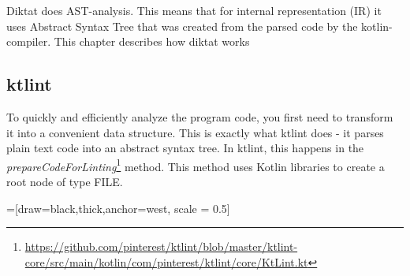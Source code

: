 Diktat does AST-analysis. This means that for internal representation (IR) it uses Abstract Syntax Tree that was created from the parsed code by the kotlin-compiler.  This chapter describes how diktat works

\subsection{ktlint}
\par
To quickly and efficiently analyze the program code, you first need to transform it into a convenient data structure. This is exactly what ktlint does - it parses plain text code into an abstract syntax tree. In ktlint, this happens in the \textsl{prepareCodeForLinting}\footnote{\url{https://github.com/pinterest/ktlint/blob/master/ktlint-core/src/main/kotlin/com/pinterest/ktlint/core/KtLint.kt}} method. This method uses Kotlin libraries to create a root node of type FILE.

=[draw=black,thick,anchor=west, scale = 0.5]

